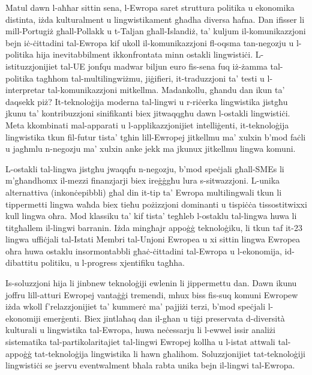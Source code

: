 \begin{multicols}{2}
Matul dawn l-aħħar sittin sena, l-Ewropa saret struttura politika u ekonomika distinta, iżda kulturalment u lingwistikament għadha diversa ħafna. Dan ifisser li mill-Portugiż għall-Pollakk u t-Taljan għall-Islandiż, ta’ kuljum il-komunikazzjoni bejn iċ-ċittadini tal-Ewropa kif ukoll il-komunikazzjoni fl-oqsma tan-negozju u l-politika hija inevitabbilment ikkonfrontata minn ostakli lingwistiċi. L-istituzzjonijiet tal-UE jonfqu madwar biljun euro fis-sena fuq iż-żamma tal-politika tagħhom tal-multilingwiżmu, jiġifieri, it-traduzzjoni ta’ testi u l-interpretar tal-komunikazzjoni mitkellma. Madankollu, għandu dan ikun ta’ daqsekk piż? It-teknoloġija moderna tal-lingwi u r-riċerka lingwistika jistgħu jkunu ta’ kontribuzzjoni sinifikanti biex jitwaqqgħu dawn l-ostakli lingwistiċi. Meta kkombinati mal-apparati u l-applikazzjonijiet intelliġenti, it-teknoloġija lingwistika tkun fil-futur tista’ tgħin lill-Ewropej jitkellmu ma’ xulxin b’mod faċli u jagħmlu n-negozju ma’ xulxin anke jekk ma jkunux jitkellmu lingwa komuni.


L-ostakli tal-lingwa jistgħu jwaqqfu n-negozju, b’mod speċjali għall-SMEs li m’għandhomx il-mezzi finanzjarji biex ireġġgħu lura s-sitwazzjoni. L-unika alternattiva (inkonċepibbli) għal din it-tip ta’ Ewropa multilingwali tkun li tippermetti lingwa waħda biex tieħu pożizzjoni dominanti u tispiċċa tissostitwixxi kull lingwa oħra. 
Mod klassiku ta’ kif tista’ tegħleb l-ostaklu tal-lingwa huwa li titgħallem il-lingwi barranin. Iżda mingħajr appoġġ teknoloġiku, li tkun taf it-23 lingwa uffiċjali tal-Istati Membri tal-Unjoni Ewropea u xi sittin lingwa Ewropea oħra huwa ostaklu insormontabbli għaċ-ċittadini tal-Ewropa u l-ekonomija, id-dibattitu politiku, u l-progress xjentifiku tagħha.
   
Is-soluzzjoni hija li jinbnew teknoloġiji ewlenin li jippermettu dan. Dawn ikunu joffru lill-atturi Ewropej vantaġġi tremendi, mhux biss fis-suq komuni Ewropew iżda wkoll f’relazzjonijiet ta’ kummerċ ma’ pajjiżi terzi, b’mod speċjali l-ekonomiji emerġenti. Biex jintlaħaq dan il-għan u tiġi preservata d-diversità kulturali u lingwistika tal-Ewropa, huwa neċessarju li l-ewwel issir analiżi sistematika tal-partikolaritajiet tal-lingwi Ewropej kollha u l-istat attwali tal-appoġġ tat-teknoloġija lingwistika li hawn għalihom. Soluzzjonijiet tat-teknoloġiji lingwistiċi se jservu eventwalment bħala rabta unika bejn il-lingwi tal-Ewropa.


\end{multicols}
